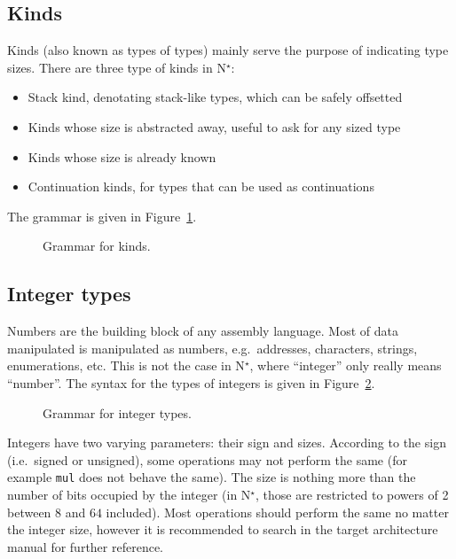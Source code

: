 \subsection{Kinds}\label{subsec:nstar-common-ts-kinds}

Kinds (also known as types of types) mainly serve the purpose of indicating type sizes.
There are three type of kinds in N$^\star$:
\begin{itemize}
  \item Stack kind, denotating stack-like types, which can be safely offsetted
  \item Kinds whose size is abstracted away, useful to ask for any sized type
  \item Kinds whose size is already known
  \item Continuation kinds, for types that can be used as continuations
\end{itemize}
The grammar is given in Figure~\ref{fig:nstar-common-ts-kinds-syntax}.

\begin{figure}[htb]
  \centering
  \caption{Grammar for kinds.}
  \label{fig:nstar-common-ts-kinds-syntax}
\end{figure}

\subsection{Integer types}\label{subsec:nstar-common-ts-integer}

Numbers are the building block of any assembly language. Most of data manipulated is manipulated as numbers, e.g.\ addresses, characters, strings, enumerations, etc.
This is not the case in N$^\star$, where ``integer''  only really means ``number''.
The syntax for the types of integers is given in Figure~\ref{fig:nstar-common-ts-integer-syntax}.

\begin{figure}[htb]
  \centering
  \caption{Grammar for integer types.}
  \label{fig:nstar-common-ts-integer-syntax}
\end{figure}

Integers have two varying parameters: their sign and sizes.
According to the sign (i.e.\ signed or unsigned), some operations may not perform the same (for example \texttt{mul} does not behave the same).
The size is nothing more than the number of bits occupied by the integer (in N$^\star$, those are restricted to powers of 2 between $8$ and $64$ included).
Most operations should perform the same no matter the integer size, however it is recommended to search in the target architecture manual for further reference.

